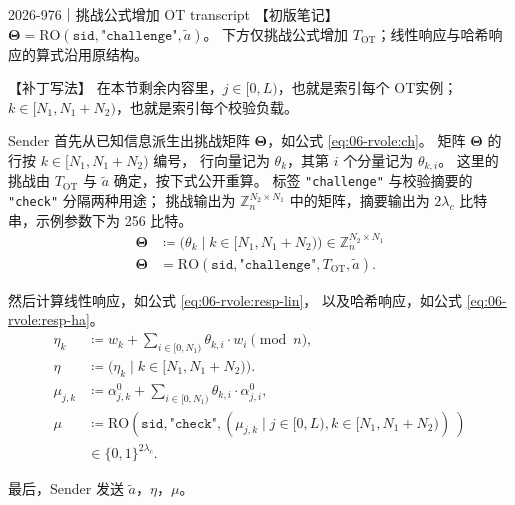 \begin{patchnote}{2026-976｜挑战公式增加 OT transcript}
  【初版笔记】$\boldsymbol{\Theta}=\mathrm{RO}(\mathtt{sid},\texttt{"challenge"},\tilde a)$。
  下方仅挑战公式增加 $T_{\mathrm{OT}}$；线性响应与哈希响应的算式沿用原结构。

  【补丁写法】
  在本节剩余内容里，$j\in[0, L)$，也就是索引每个 OT实例；
  $k\in[N_1, N_1+N_2)$，也就是索引每个校验负载。

  Sender 首先从已知信息派生出挑战矩阵 $\boldsymbol{\Theta}$，如公式 \eqref{eq:06-rvole:ch}。
  矩阵 $\boldsymbol{\Theta}$ 的行按 $k\in[N_1,N_1+N_2)$ 编号，
  行向量记为 $\theta_k$，其第 $i$ 个分量记为 $\theta_{k,i}$。
  这里的挑战由 $T_{\mathrm{OT}}$ 与 $\tilde a$ 确定，按下式公开重算。
  标签 \texttt{"challenge"} 与校验摘要的 \texttt{"check"} 分隔两种用途；
  挑战输出为 $\mathbb Z_n^{N_2\times N_1}$ 中的矩阵，摘要输出为 $2\lambda_c$ 比特串，示例参数下为 256 比特。
  \begin{equation}
    \label{eq:06-rvole:ch}\tag{ch}
    \begin{aligned}
      \boldsymbol{\Theta} & \coloneq 
      \bigl(\theta_k \mid k\in[N_1,N_1+N_2)\bigr) \in \mathbb Z_n^{N_2\times N_1}
      \\
      \boldsymbol{\Theta} & = 
      \mathrm{RO}(\mathtt{sid},\texttt{"challenge"},T_{\mathrm{OT}},\tilde a).
    \end{aligned}
  \end{equation}

  然后计算线性响应，如公式 \eqref{eq:06-rvole:resp-lin}，
  以及哈希响应，如公式 \eqref{eq:06-rvole:resp-ha}。
  \begin{align*}
    \label{eq:06-rvole:resp-lin}\tag{resp-lin}
    \eta_k    & \coloneq w_{k}+\sum_{i\in[0,N_1)}\theta_{k,i}\cdot w_{i} \pmod n,
    \\
    \eta      & \coloneq \bigl(\eta_k \mid k\in[N_1,N_1+N_2)\bigr).
    \\
    \mu_{j,k} & \coloneq \alpha^0_{j,k}
    +\sum_{i\in[0,N_1)}\theta_{k,i}\cdot \alpha^0_{j,i},
    \\
    \label{eq:06-rvole:resp-ha}\tag{resp-ha}
    \mu       & \coloneq \mathrm{RO}\left(\mathtt{sid},\texttt{"check"},
    \left(\mu_{j,k} \mid j\in[0,L),k\in[N_1,N_1+N_2)\right)~\right)
    \\
    & \in \{0,1\}^{2\lambda_c}.
  \end{align*}

  最后，Sender 发送 $\tilde a$，$\eta$，$\mu$。
\end{patchnote}


